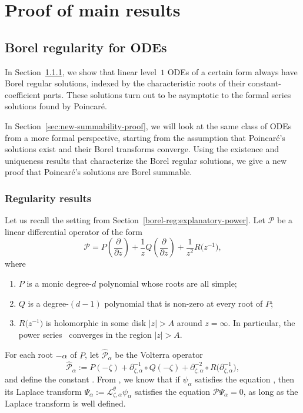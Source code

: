 \documentclass[pdftex]{sigma}
\newcommand{\laplace}{\mathcal{L}}
\numberwithin{equation}{section}
\begin{document}
\section{Proof of main results}\label{sec:proof_main_results}
\subsection{Borel regularity for ODEs}\label{borel_reg-ODE}
In Section~\ref{sec:regularity-results}, we show that linear level~$1$ ODEs of a certain form always have Borel regular solutions, indexed by the characteristic roots of their constant-coefficient parts. These solutions turn out to be asymptotic to the formal series solutions found by Poincar\'e.

In Section~\ref{sec:new-summability-proof}, we will look at the same class of ODEs from a more formal perspective, starting from the assumption that Poincar\'e's solutions exist and their Borel transforms converge. Using the existence and uniqueness results that characterize the Borel regular solutions, we give a new proof that Poincar\'e's solutions are Borel summable.
%
\subsubsection{Regularity results}\label{sec:regularity-results}
Let us recall the setting from Section~\ref{borel-reg:explanatory-power}. Let $\mathcal{P}$ be a linear differential operator of the form
\begin{equation}\label{eqn:operator-P}
\mathcal{P} = P\left(\frac{\partial}{\partial z}\right) + \frac{1}{z} Q\left(\frac{\partial}{\partial z}\right) + \frac{1}{z^2} R\bigl(z^{-1}\bigr),
\end{equation}
where
\begin{enumerate}\itemsep=0pt
\item[(1)] $P$ is a monic degree-$d$ polynomial whose roots are all simple;
\item[(2)] $Q$ is a degree-$(d-1)$ polynomial that is non-zero at every root of $P$;
\item[(3)] $R\bigl(z^{-1}\bigr)$ is holomorphic in some disk $|z| > A$ around $z = \infty$. In particular, the power series~
converges in the region $|z| > A$.
\end{enumerate}
For each root $-\alpha$ of $P$, let $\hat{\mathcal{P}}_{\alpha}$ be the Volterra operator
\begin{equation}\label{eq:hat_P}
\hat{\mathcal{P}}_\alpha:=P(-\zeta)+\partial_{\zeta,\alpha}^{-1}\circ Q(-\zeta)+\partial_{\zeta,\alpha}^{-2}\circ R\bigl(\partial_{\zeta,\alpha}^{-1}\bigr),
\end{equation}
and define the constant . From \cite[Lemma~4.3]{reg-sing-volterra}, we know that if $\psi_\alpha$ satisfies the equation , then its Laplace transform $\Psi_\alpha:=\laplace_{\zeta,\alpha}^{\theta}\psi_\alpha$ satisfies the equation $\mathcal{P}\Psi_\alpha=0$, as long as the Laplace transform is well defined.
\end{document}
